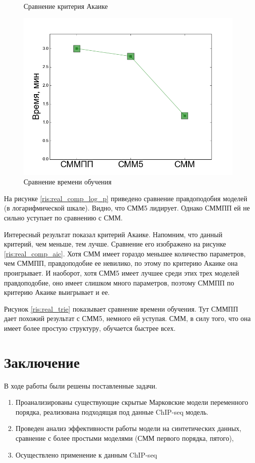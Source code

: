 \documentclass{matmex-diploma-custom}
\begin{document}
\begin{figure}[h!]
\begin{minipage}[b]{0.32 \textwidth}
	\centering
	\caption{ Сравнение критерия Акаике }
	\label{ris:real_comp_aic}
\end{minipage}
\hfill
\begin{minipage}[b]{0.32 \textwidth}
	\includegraphics[scale=0.28]{img/real/time.png}
	\centering
	\caption{ Сравнение времени обучения }
	\label{ris:real_comp_time}
\end{minipage}
\end{figure}

На рисунке \ref{ris:real_comp_log_p} приведено сравнение правдоподобия моделей (в логарифмической шкале). Видно, что СММ5 лидирует. Однако СММПП ей не сильно уступает по сравнению с СММ.

Интересный результат показал критерий Акаике. Напомним, что данный критерий, чем меньше, тем лучше. Сравнение его изображено на рисунке \ref{ris:real_comp_aic}.
Хотя СММ имеет гораздо меньшее количество параметров, чем СММПП, правдоподобие ее невилико, по этому по критерию Акаике она проигрывает. И наоборот, хотя СММ5 имеет лучшее среди этих трех моделей правдоподобие, оно имеет слишком много параметров, поэтому СММПП по критерию Акаике выигрывает и ее.

Рисунок \ref{ris:real_trie} показывает сравнение времени обучения. Тут СММПП дает похожий результат с СММ5, немного ей уступая. СММ, в силу того, что она имеет более простую структуру, обучается быстрее всех.


\section*{Заключение}
В ходе работы были решены поставленные задачи.
\begin{enumerate}
\item
Проанализированы существующие скрытые Марковские
модели переменного порядка, реализована подходящая под данные ChIP-seq модель.
\item
Проведен анализ эффективности работы модели на
синтетических данных, сравнение с более простыми
моделями (СММ первого порядка, пятого), 
\item
Осуществлено применение к
данным ChIP-seq
\end{enumerate}






\end{document}
